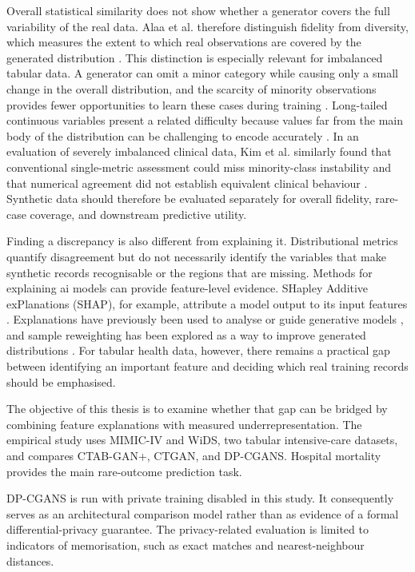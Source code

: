 Overall statistical similarity does not show whether a generator covers the
full variability of the real data. Alaa et al. therefore distinguish fidelity
from diversity, which measures the extent to which real observations are
covered by the generated distribution \cite{Alaa2022FaithfulSyntheticData}.
This distinction is especially relevant for imbalanced tabular data. A
generator can omit a minor category while causing only a small change in the
overall distribution, and the scarcity of minority observations provides
fewer opportunities to learn these cases during training
\cite{Xu2019CTGAN}. Long-tailed continuous variables present a related
difficulty because values far from the main body of the distribution can be
challenging to encode accurately \cite{Zhao2024CTABGANPlus}. In an evaluation
of severely imbalanced clinical data, Kim et al. similarly found that
conventional single-metric assessment could miss minority-class instability
and that numerical agreement did not establish equivalent clinical behaviour
\cite{Kim2026IntegratedSyntheticClinicalEvaluation}. Synthetic data should
therefore be evaluated separately for overall fidelity, rare-case coverage,
and downstream predictive utility.

Finding a discrepancy is also different from explaining it. Distributional
metrics quantify disagreement but do not necessarily identify the variables
that make synthetic records recognisable or the regions that are missing.
Methods for explaining \gls{ai} models can provide feature-level evidence.
SHapley Additive exPlanations (SHAP), for example, attribute a model output to
its input features \cite{Lundberg2017SHAP}. Explanations have previously been
used to analyse or guide generative models
\cite{Nagisetty2020XAIGAN,Rozendo2024XGAN}, and sample reweighting has been
explored as a way to improve generated distributions
\cite{Diefenbacher2020DCTRGAN}. For tabular health data, however, there remains
a practical gap between identifying an important feature and deciding which
real training records should be emphasised.

The objective of this thesis is to examine whether that gap can be bridged by
combining feature explanations with measured underrepresentation. The
empirical study uses MIMIC-IV \cite{PhysioNet-mimiciv-3.1} and WiDS, two
tabular intensive-care datasets, and compares CTAB-GAN+, CTGAN, and DP-CGANS.
Hospital mortality provides the main rare-outcome prediction task.

DP-CGANS is run with private training disabled in this study. It consequently
serves as an architectural comparison model rather than as evidence of a
formal differential-privacy guarantee. The privacy-related evaluation is
limited to indicators of memorisation, such as exact matches and
nearest-neighbour distances.

